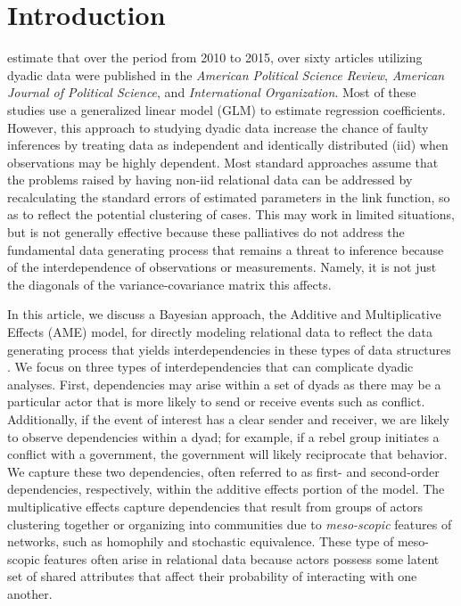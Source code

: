 \section{\textbf{Introduction}}

\citet{aronow:etal:2015} estimate that over the period from 2010 to 2015, over sixty articles utilizing dyadic data were published in the \textit{American Political Science Review}, \textit{American Journal of Political Science}, and \textit{International Organization}. Most of these studies use a generalized linear model (GLM) to estimate regression coefficients.  However, this approach to studying dyadic data increase the chance of faulty inferences by treating data as independent and identically distributed (iid) when observations may be highly dependent. Most standard approaches assume that the problems raised by having non-iid relational data can be addressed by recalculating the standard errors of estimated parameters in the link function, so as to reflect the potential clustering of cases. This may work in limited situations, but is not generally effective because these palliatives do not address the fundamental data generating process that remains a threat to inference because of the interdependence of observations or measurements. Namely, it is not just the diagonals of the variance-covariance matrix this affects. %

In this article, we discuss a Bayesian approach, the Additive and Multiplicative Effects (AME) model, for directly modeling relational data to reflect the data generating process that yields interdependencies in these types of data structures \citep{hoff:2008,minhas:etal:2016:arxiv}. We focus on three types of interdependencies that can complicate dyadic analyses. First, dependencies may arise within a set of dyads as there may be a particular actor that is more likely to send or receive events such as conflict. Additionally, if the event of interest has a clear sender and receiver, we are likely to observe dependencies within a dyad; for example, if a rebel group initiates a conflict with a government, the government will likely reciprocate that behavior. We capture these two dependencies, often referred to as first- and second-order dependencies, respectively, within the additive effects portion of the model. The multiplicative effects capture dependencies that result from groups of actors clustering together or organizing into communities due to \textit{meso-scopic} features of networks, such as homophily and stochastic equivalence. These type of meso-scopic features often arise in relational data because actors possess some latent set of shared attributes that affect their probability of interacting with one another. 

